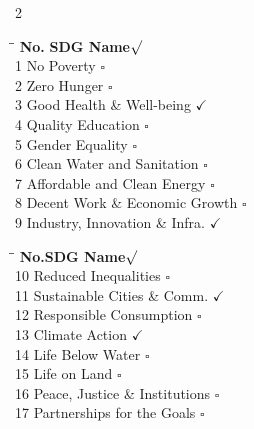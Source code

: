 \footnotesize
\begin{multicols}{2}
\noindent
\begin{tabbing}
\hspace{0.7cm}\=\hspace{5.4cm}\=\kill
\textbf{No. }\> \textbf{SDG Name}\>\textbf{$\surd$}\\[1pt]
1  \> No Poverty                     \> $\square$ \\[0pt]
2  \> Zero Hunger                    \> $\square$ \\[0pt]
3  \> Good Health \& Well-being      \> $\checkmark$ \\[0pt]
4  \> Quality Education              \> $\square$ \\[0pt]
5  \> Gender Equality                \> $\square$ \\[0pt]
6  \> Clean Water and Sanitation     \> $\square$ \\[0pt]
7  \> Affordable and Clean Energy    \> $\square$ \\[0pt]
8  \> Decent Work \& Economic Growth \> $\square$ \\[0pt]
9  \> Industry, Innovation \& Infra. \> $\checkmark$ \\[0pt]
\end{tabbing}

\columnbreak

\noindent
\begin{tabbing}
\hspace{0.7cm}\=\hspace{5.4cm}\=\kill
\textbf{No.}\>\textbf{SDG Name}\>\textbf{$\surd$}\\[1pt]
10 \> Reduced Inequalities           \> $\square$ \\[0pt]
11 \> Sustainable Cities \& Comm.    \> $\checkmark$ \\[0pt]
12 \> Responsible Consumption        \> $\square$ \\[0pt]
13 \> Climate Action                 \> $\checkmark$ \\[0pt]
14 \> Life Below Water               \> $\square$ \\[0pt]
15 \> Life on Land                   \> $\square$ \\[0pt]
16 \> Peace, Justice \& Institutions \> $\square$ \\[0pt]
17 \> Partnerships for the Goals     \> $\square$ \\[0pt]
\end{tabbing}
\end{multicols}

